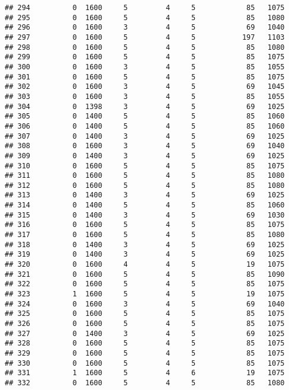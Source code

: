 \documentclass[]{article}
\begin{document}
\begin{verbatim}
## 294          0  1600     5         4     5            85   1075
## 295          0  1600     5         4     5            85   1080
## 296          0  1600     3         4     5            69   1040
## 297          0  1600     5         4     5           197   1103
## 298          0  1600     5         4     5            85   1080
## 299          0  1600     5         4     5            85   1075
## 300          0  1600     3         4     5            85   1055
## 301          0  1600     5         4     5            85   1075
## 302          0  1600     3         4     5            69   1045
## 303          0  1600     3         4     5            85   1055
## 304          0  1398     3         4     5            69   1025
## 305          0  1400     5         4     5            85   1060
## 306          0  1400     5         4     5            85   1060
## 307          0  1400     3         4     5            69   1025
## 308          0  1600     3         4     5            69   1040
## 309          0  1400     3         4     5            69   1025
## 310          0  1600     5         4     5            85   1075
## 311          0  1600     5         4     5            85   1080
## 312          0  1600     5         4     5            85   1080
## 313          0  1400     3         4     5            69   1025
## 314          0  1400     5         4     5            85   1060
## 315          0  1400     3         4     5            69   1030
## 316          0  1600     5         4     5            85   1075
## 317          0  1600     5         4     5            85   1080
## 318          0  1400     3         4     5            69   1025
## 319          0  1400     3         4     5            69   1025
## 320          0  1600     4         4     5            19   1075
## 321          0  1600     5         4     5            85   1090
## 322          0  1600     5         4     5            85   1075
## 323          1  1600     5         4     5            19   1075
## 324          0  1600     3         4     5            69   1040
## 325          0  1600     5         4     5            85   1075
## 326          0  1600     5         4     5            85   1075
## 327          0  1400     3         4     5            69   1025
## 328          0  1600     5         4     5            85   1075
## 329          0  1600     5         4     5            85   1075
## 330          0  1600     5         4     5            85   1075
## 331          1  1600     5         4     6            19   1075
## 332          0  1600     5         4     5            85   1080

\end{verbatim}
\end{document}
